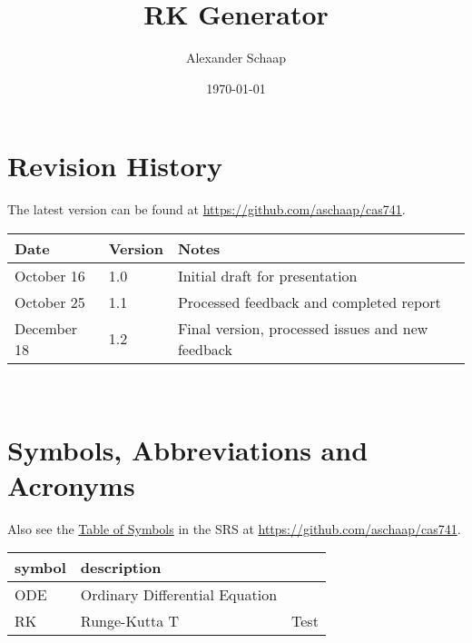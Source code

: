 \documentclass[12pt, titlepage]{article}
\begin{document}
\title{RK Generator} 
\author{Alexander Schaap}
\date{\today}
	
\maketitle


\section{Revision History}
The latest version can be found at \url{https://github.com/aschaap/cas741}.\\

\noindent
\begin{tabularx}{\textwidth}{p{3cm}p{2cm}X}
\toprule {\bf Date} & {\bf Version} & {\bf Notes}\\
\midrule
October 16 & 1.0 & Initial draft for presentation\\
October 25 & 1.1 & Processed feedback and completed report\\
December 18 & 1.2 & Final version, processed issues and new feedback\\
\bottomrule
\end{tabularx}

~\newpage

\section{Symbols, Abbreviations and Acronyms}
Also see the \href{../SRS/CA.pdf#ssec:symbols}{Table of Symbols} in the SRS at 
\url{https://github.com/aschaap/cas741}.\\

\noindent
\renewcommand{\arraystretch}{1.2}
\begin{tabular}{l l} 
  \toprule		
  \textbf{symbol} & \textbf{description}\\
  \midrule 
  ODE & Ordinary Differential Equation\\
  RK & Runge-Kutta
  T & Test\\
  \bottomrule
\end{tabular}\\


\newpage

\tableofcontents

\end{document}
